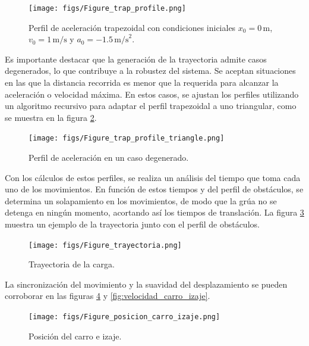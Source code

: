 \documentclass{article}
\begin{document}
            \begin{figure}[H]
                \centering
                \texttt{[image: figs/Figure\_trap\_profile.png]}
                \caption{Perfil de aceleración trapezoidal con condiciones iniciales \(x_0=0 \, \text{m}\), \(v_0=1 \, \text{m/s}\) y \(a_0=-1.5 \, \text{m/s}^2\).}
                \label{fig:perfil}
            \end{figure}

            Es importante destacar que la generación de la trayectoria admite casos degenerados, lo que contribuye a la robustez del sistema. Se aceptan situaciones en las que la distancia recorrida es menor que la requerida para alcanzar la aceleración o velocidad máxima. En estos casos, se ajustan los perfiles utilizando un algoritmo recursivo para adaptar el perfil trapezoidal a uno triangular, como se muestra en la figura \ref{fig:perfilTriangular}.

            \begin{figure}[H]
                \centering
                \texttt{[image: figs/Figure\_trap\_profile\_triangle.png]}
                \caption{Perfil de aceleración en un caso degenerado.}
                \label{fig:perfilTriangular}
            \end{figure}

            Con los cálculos de estos perfiles, se realiza un análisis del tiempo que toma cada uno de los movimientos. En función de estos tiempos y del perfil de obstáculos, se determina un solapamiento en los movimientos, de modo que la grúa no se detenga en ningún momento, acortando así los tiempos de translación. La figura \ref{fig:trayectoria} muestra un ejemplo de la trayectoria junto con el perfil de obstáculos.

            \begin{figure}[H]
                \centering
                \texttt{[image: figs/Figure\_trayectoria.png]}
                \caption{Trayectoria de la carga.}
                \label{fig:trayectoria}
            \end{figure}

            La sincronización del movimiento y la suavidad del desplazamiento se pueden corroborar en las figuras \ref{fig:posicion_carro_izaje} y \ref{fig:velocidad_carro_izaje}.

            \begin{figure}[H]
                \centering
                \texttt{[image: figs/Figure\_posicion\_carro\_izaje.png]}
                \caption{Posición del carro e izaje.}
                \label{fig:posicion_carro_izaje}
            \end{figure}
\end{document}
